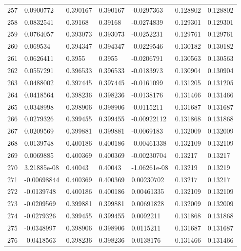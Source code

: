 \begin{longtable}{l|lll|lll}
 257 &  0.0900772   & 0.390167    & 0.390167    & -0.0297363   & 0.128802    & 0.128802    \\
 258 &  0.0832541   & 0.39168     & 0.39168     & -0.0274839   & 0.129301    & 0.129301    \\
 259 &  0.0764057   & 0.393073    & 0.393073    & -0.0252231   & 0.129761    & 0.129761    \\
 260 &  0.069534    & 0.394347    & 0.394347    & -0.0229546   & 0.130182    & 0.130182    \\
 261 &  0.0626411   & 0.3955      & 0.3955      & -0.0206791   & 0.130563    & 0.130563    \\
 262 &  0.0557291   & 0.396533    & 0.396533    & -0.0183973   & 0.130904    & 0.130904    \\
 263 &  0.0488002   & 0.397445    & 0.397445    & -0.0161099   & 0.131205    & 0.131205    \\
 264 &  0.0418564   & 0.398236    & 0.398236    & -0.0138176   & 0.131466    & 0.131466    \\
 265 &  0.0348998   & 0.398906    & 0.398906    & -0.0115211   & 0.131687    & 0.131687    \\
 266 &  0.0279326   & 0.399455    & 0.399455    & -0.00922112  & 0.131868    & 0.131868    \\
 267 &  0.0209569   & 0.399881    & 0.399881    & -0.0069183   & 0.132009    & 0.132009    \\
 268 &  0.0139748   & 0.400186    & 0.400186    & -0.00461338  & 0.132109    & 0.132109    \\
 269 &  0.0069885   & 0.400369    & 0.400369    & -0.00230704  & 0.13217     & 0.13217     \\
 270 &  3.21885e-08 & 0.40043     & 0.40043     & -1.06261e-08 & 0.13219     & 0.13219     \\
 271 & -0.00698844  & 0.400369    & 0.400369    &  0.00230702  & 0.13217     & 0.13217     \\
 272 & -0.0139748   & 0.400186    & 0.400186    &  0.00461335  & 0.132109    & 0.132109    \\
 273 & -0.0209569   & 0.399881    & 0.399881    &  0.00691828  & 0.132009    & 0.132009    \\
 274 & -0.0279326   & 0.399455    & 0.399455    &  0.0092211   & 0.131868    & 0.131868    \\
 275 & -0.0348997   & 0.398906    & 0.398906    &  0.0115211   & 0.131687    & 0.131687    \\
 276 & -0.0418563   & 0.398236    & 0.398236    &  0.0138176   & 0.131466    & 0.131466    \\

\end{longtable}
